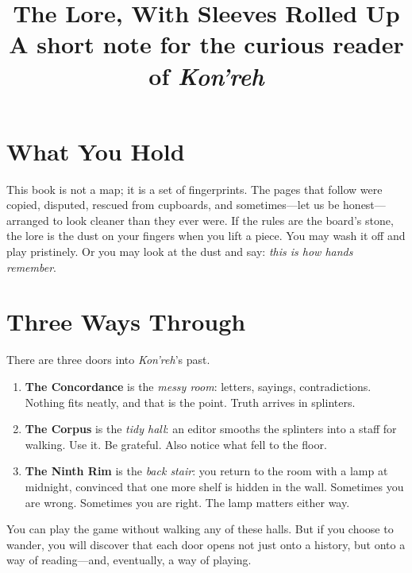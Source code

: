 \documentclass[11pt]{article}
\title{The Lore, With Sleeves Rolled Up\\\large A short note for the curious reader of \emph{Kon'reh}}
\author{}
\date{}
\begin{document}
\maketitle
\onehalfspacing

\section*{What You Hold}
This book is not a map; it is a set of fingerprints. The pages that follow were copied, disputed, rescued from cupboards, and sometimes---let us be honest---arranged to look cleaner than they ever were. If the rules are the board's stone, the lore is the dust on your fingers when you lift a piece. You may wash it off and play pristinely. Or you may look at the dust and say: \emph{this is how hands remember}.

\section*{Three Ways Through}
There are three doors into \emph{Kon'reh}'s past.

\begin{enumerate}[leftmargin=*,label=\arabic*)]
  \item \textbf{The Concordance} is the \emph{messy room}: letters, sayings, contradictions. Nothing fits neatly, and that is the point. Truth arrives in splinters.
  \item \textbf{The Corpus} is the \emph{tidy hall}: an editor smooths the splinters into a staff for walking. Use it. Be grateful. Also notice what fell to the floor.
  \item \textbf{The Ninth Rim} is the \emph{back stair}: you return to the room with a lamp at midnight, convinced that one more shelf is hidden in the wall. Sometimes you are wrong. Sometimes you are right. The lamp matters either way.
\end{enumerate}

You can play the game without walking any of these halls. But if you choose to wander, you will discover that each door opens not just onto a history, but onto a way of reading---and, eventually, a way of playing.
\end{document}
